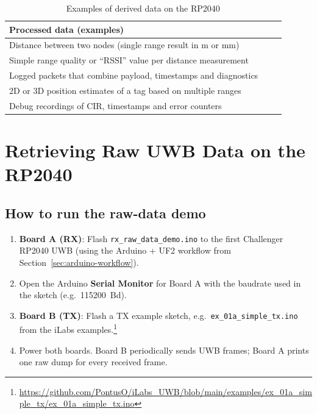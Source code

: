 \documentclass[a4paper,11pt]{article}
\begin{document}
\begin{table}[h]
	\centering
	\caption{Examples of derived data on the RP2040}
	\label{tab:uwb-rp2040-data-simple}
	\begin{tabular}{p{0.9\linewidth}}
		\toprule
		\textbf{Processed data (examples)} \\
		\midrule
		Distance between two nodes (single range result in m or mm) \\
		Simple range quality or “RSSI” value per distance measurement \\
		Logged packets that combine payload, timestamps and diagnostics \\
		2D or 3D position estimates of a tag based on multiple ranges \\
		Debug recordings of CIR, timestamps and error counters \\
		\bottomrule
	\end{tabular}
\end{table}

	
	\newpage
	
	\section{Retrieving Raw UWB Data on the RP2040}
	\label{sec:raw-data-demo}
	
	
	\subsection{How to run the raw-data demo}
	
	\begin{tcolorbox}[title=Step-by-step setup,colback=accentlight!60!white,sharp corners]
		\begin{enumerate}
			\item \textbf{Board A (RX)}:  
			Flash \texttt{rx\_raw\_data\_demo.ino} to the first Challenger RP2040 UWB  
			(using the Arduino + UF2 workflow from Section~\ref{sec:arduino-workflow}).
			\item Open the Arduino \textbf{Serial Monitor} for Board A with the baudrate
			used in the sketch (e.g.\ 115200~Bd).
			\item \textbf{Board B (TX)}:  
			Flash a TX example sketch, e.g.\ \texttt{ex\_01a\_simple\_tx.ino} from the
			iLabs examples.\footnote{\url{https://github.com/PontusO/iLabs_UWB/blob/main/examples/ex_01a_simple_tx/ex_01a_simple_tx.ino}}
			\item Power both boards.  
			Board B periodically sends UWB frames; Board A prints one raw dump for
			every received frame.
		\end{enumerate}
	\end{tcolorbox}
	
\end{document}
